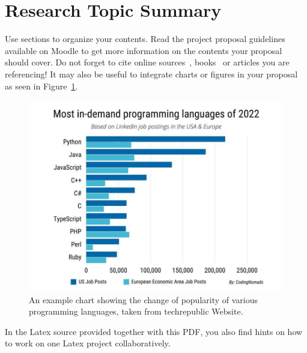 \section{Research Topic Summary}

Use sections to organize your contents. Read the project proposal guidelines available on Moodle to get more information on the contents your proposal should cover. Do not forget to cite online sources~\cite{WFR2017}, books~\cite{grus2019data} or articles you are referencing! It may also be useful to integrate charts or figures in your proposal as seen in Figure~\ref{fig:example}.

\begin{figure}[h]
  \centering
  \includegraphics[scale=0.3]{figures/most-in-demand-programming-languages-of-2022-codingnomads.jpg}
  \caption[]{An example chart showing the change of popularity of
    various programming languages, taken from techrepublic Website\footnotemark[1].}
  \label{fig:example}
\end{figure}


In the Latex source provided together with this PDF, you also find hints on how to work on one Latex project collaboratively.